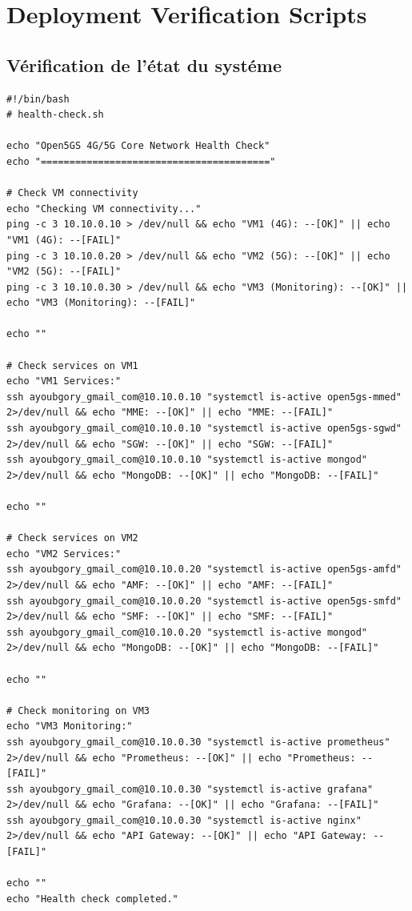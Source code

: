 \documentclass[12pt,a4paper]{report}
\begin{document}
\section{Deployment Verification Scripts}

\subsection{Vérification de l'état du systéme}

\begin{lstlisting}[caption=Script de vérification de l'état du systéme]
#!/bin/bash
# health-check.sh

echo "Open5GS 4G/5G Core Network Health Check"
echo "========================================"

# Check VM connectivity
echo "Checking VM connectivity..."
ping -c 3 10.10.0.10 > /dev/null && echo "VM1 (4G): --[OK]" || echo "VM1 (4G): --[FAIL]"
ping -c 3 10.10.0.20 > /dev/null && echo "VM2 (5G): --[OK]" || echo "VM2 (5G): --[FAIL]"
ping -c 3 10.10.0.30 > /dev/null && echo "VM3 (Monitoring): --[OK]" || echo "VM3 (Monitoring): --[FAIL]"

echo ""

# Check services on VM1
echo "VM1 Services:"
ssh ayoubgory_gmail_com@10.10.0.10 "systemctl is-active open5gs-mmed" 2>/dev/null && echo "MME: --[OK]" || echo "MME: --[FAIL]"
ssh ayoubgory_gmail_com@10.10.0.10 "systemctl is-active open5gs-sgwd" 2>/dev/null && echo "SGW: --[OK]" || echo "SGW: --[FAIL]"
ssh ayoubgory_gmail_com@10.10.0.10 "systemctl is-active mongod" 2>/dev/null && echo "MongoDB: --[OK]" || echo "MongoDB: --[FAIL]"

echo ""

# Check services on VM2
echo "VM2 Services:"
ssh ayoubgory_gmail_com@10.10.0.20 "systemctl is-active open5gs-amfd" 2>/dev/null && echo "AMF: --[OK]" || echo "AMF: --[FAIL]"
ssh ayoubgory_gmail_com@10.10.0.20 "systemctl is-active open5gs-smfd" 2>/dev/null && echo "SMF: --[OK]" || echo "SMF: --[FAIL]"
ssh ayoubgory_gmail_com@10.10.0.20 "systemctl is-active mongod" 2>/dev/null && echo "MongoDB: --[OK]" || echo "MongoDB: --[FAIL]"

echo ""

# Check monitoring on VM3
echo "VM3 Monitoring:"
ssh ayoubgory_gmail_com@10.10.0.30 "systemctl is-active prometheus" 2>/dev/null && echo "Prometheus: --[OK]" || echo "Prometheus: --[FAIL]"
ssh ayoubgory_gmail_com@10.10.0.30 "systemctl is-active grafana" 2>/dev/null && echo "Grafana: --[OK]" || echo "Grafana: --[FAIL]"
ssh ayoubgory_gmail_com@10.10.0.30 "systemctl is-active nginx" 2>/dev/null && echo "API Gateway: --[OK]" || echo "API Gateway: --[FAIL]"

echo ""
echo "Health check completed."
\end{lstlisting}
\end{document}
